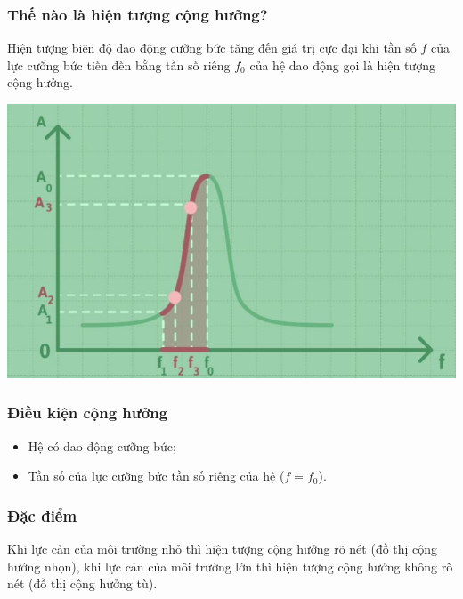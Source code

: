 \subsubsection{Thế nào là hiện tượng cộng hưởng?}
Hiện tượng biên độ dao động cưỡng bức tăng đến giá trị cực đại khi tần số $f$ của lực cưỡng bức tiến đến bằng tần số riêng $f_0$ của hệ dao động gọi là hiện tượng cộng hưởng.
\begin{center}
	\includegraphics[scale=0.5]{../figs/VN12-PH-05-L-004-2-V2-01.jpg}
\end{center}
\subsubsection{Điều kiện cộng hưởng}
\begin{itemize}
	\item Hệ có dao động cưỡng bức;
	\item Tần số của lực cưỡng bức  tần số riêng của hệ ($f=f_0$).
\end{itemize}
\subsubsection{Đặc điểm}
Khi lực cản của môi trường nhỏ thì hiện tượng cộng hưởng rõ nét (đồ thị cộng hưởng nhọn), khi lực cản của môi trường lớn thì hiện tượng cộng hưởng không rõ nét (đồ thị cộng hưởng tù).

